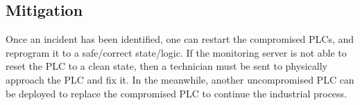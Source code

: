 \subsection{Mitigation}

Once an incident has been identified, one can restart the compromised PLCs, and reprogram it to a safe/correct state/logic. If the monitoring server is not able to reset the PLC to a clean state, then a technician must be sent to physically approach the PLC and fix it. In the meanwhile, another uncompromised PLC can be deployed to replace the compromised PLC to continue the industrial process. 